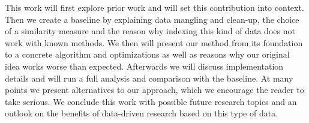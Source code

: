 This work will first explore prior work and will set this contribution into context. Then we create a baseline by explaining data mangling and clean-up, the choice of a similarity measure and the reason why indexing this kind of data does not work with known methods. We then will present our method from its foundation to a concrete algorithm and optimizations as well as reasons why our original idea works worse than expected. Afterwards we will discuss implementation details and will run a full analysis and comparison with the baseline. At many points we present alternatives to our approach, which we encourage the reader to take serious. We conclude this work with possible future research topics and an outlook on the benefits of data-driven research based on this type of data.
